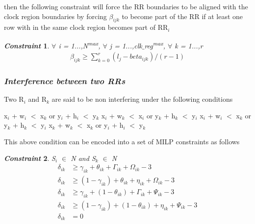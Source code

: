 \documentclass[conference]{IEEEtran}
\newtheorem{constraint}{\textit{Constraint}}
\begin{document}
then the following constraint will force the RR boundaries to be aligned with the clock region boundaries by forcing $\beta_{ijk}$ to become part of the RR if at least one row with in the same clock region becomes part of RR$_i$

\begin{constraint}  $\forall$ i = 1...,N\textsuperscript{max}, $\forall$ j = 1...,clk$\_$reg\textsuperscript{max}, $\forall$ k = 1...,r
\begin{equation}
\begin{split}
\beta_{ijk} \geq \sum_{k=0}^{r}  (l_j - beta_{ijk}) / (r - 1)
\end{split}
\end{equation}
\end{constraint}

\subsubsection*{\textit {Interference between two RRs}}
Two R$_i$ and R$_k$ are said to be non interfering under the following conditions
\begin{algorithmic}
	\STATE x$_i$ + w$_i$ $<$ x$_k$ or y$_i$ + h$_i$ $<$ y$_k$
	\STATE x$_i$ + w$_k$ $<$ x$_i$ or y$_k$ + h$_k$ $<$ y$_i$
	\STATE x$_i$ + w$_i$ $<$ x$_k$ or y$_k$ + h$_k$ $<$ y$_i$
\ELSE
	\STATE x$_k$ + w$_k$ $<$ x$_k$ or y$_i$ + h$_i$ $<$ y$_k$
\ENDIF
\end{algorithmic}

This above condition can be encoded into a set of MILP constraints as follows \\
\begin{constraint} S$_i$ $\in$ N and S$_k$ $\in$ N
\begin{equation} 
\begin{split}
\delta_{ik} & \geq \gamma_{ik} + \theta_{ik} + \Gamma_{ik} + \Omega_{ik} - 3 \\
\delta_{ik} & \geq (1 - \gamma_{ik}) + \theta_{ik} + \eta_{ik} + \Omega_{ik} - 3 \\
\delta_{ik} & \geq \gamma_{ik} +(1 - \theta_{ik}) + \Gamma_{ik} + \Psi_{ik} - 3 \\
\delta_{ik} & \geq (1 - \gamma_{ik}) + (1 - \theta_{ik}) + \eta_{ik} + \Psi_{ik} - 3 \\
\delta_{ik} & = 0 \\
\end{split}
\end{equation}
\end{constraint}
\end{document}
